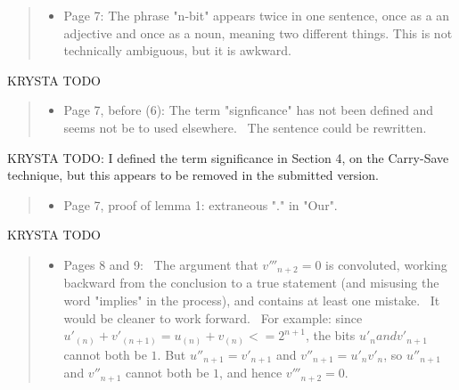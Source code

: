 \documentclass{article}
\theoremstyle{plain} \newtheorem{lemma}{Lemma}
\begin{document}
\begin{quote}
\begin{itemize}
\item
Page 7: The phrase "n-bit" appears twice in one sentence, once as a 
an adjective and once as a noun, meaning two different things. This is 
not technically ambiguous, but it is awkward. 
\end{itemize}
\end{quote}

KRYSTA TODO

\begin{quote}
\begin{itemize}
\item
Page 7, before (6): The term "signficance" has not been defined and 
seems not be to used elsewhere.  The sentence could be rewritten. 
\end{itemize}
\end{quote}

KRYSTA TODO: 
I defined the term significance in Section 4, on the Carry-Save technique,
but this appears to be removed in the submitted version.

\begin{quote}
\begin{itemize}
\item
Page 7, proof of lemma 1: extraneous "." in "Our". 
\end{itemize}
\end{quote}

KRYSTA TODO

\begin{quote}
\begin{itemize}
\item
Pages 8 and 9:  The argument that $v'''_{n+2} = 0$ is convoluted, working 
backward from the conclusion to a true statement (and misusing the word 
"implies" in the process), and contains at least one mistake.  It would be 
cleaner to work forward.  For example: since $u'_{(n)} + v'_{(n+1)} = 
u_{(n)} + v_{(n)} <= 2^{n+1}$, the bits $u'_n and v'_{n+1}$ cannot both be $1$. 
But $u''_{n+1} = v'_{n+1}$ and $v''_{n+1} = u'_n v'_n$, so $u''_{n+1}$ and 
$v''_{n+1}$ cannot both be $1$, and hence $v'''_{n+2} = 0$.
\end{itemize}
\end{quote}



\end{document}
